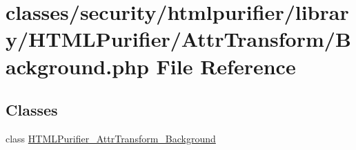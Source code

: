 \hypertarget{AttrTransform_2Background_8php}{\section{classes/security/htmlpurifier/library/\+H\+T\+M\+L\+Purifier/\+Attr\+Transform/\+Background.php File Reference}
\label{AttrTransform_2Background_8php}
}
\subsection*{Classes}
\begin{DoxyCompactItemize}
\item 
class \hyperlink{classHTMLPurifier__AttrTransform__Background}{H\+T\+M\+L\+Purifier\+\_\+\+Attr\+Transform\+\_\+\+Background}
\end{DoxyCompactItemize}
